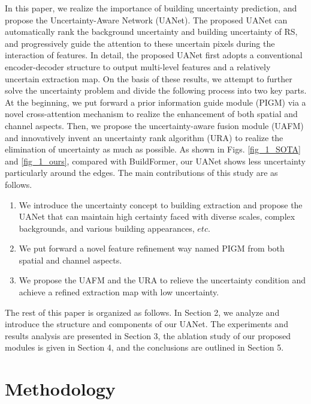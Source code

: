 \documentclass[lettersize,journal]{IEEEtran}
\begin{document}
\par
In this paper, we realize the importance of building uncertainty prediction, and propose the Uncertainty-Aware Network (UANet).
The proposed UANet can automatically rank the background uncertainty and building uncertainty of RS, and progressively guide the attention to these uncertain pixels during the interaction of features.
In detail, the proposed UANet first adopts a conventional encoder-decoder structure to output multi-level features and a relatively uncertain extraction map. On the basis of these results, we attempt to further solve the uncertainty problem and divide the following process into two key parts.
At the beginning, we put forward a prior information guide module (PIGM) via a novel cross-attention mechanism to realize the enhancement of both spatial and channel aspects. Then, we propose the uncertainty-aware fusion module (UAFM) and innovatively invent an uncertainty rank algorithm (URA) to realize the elimination of uncertainty as much as possible. As shown in Figs. \ref{fig_1_SOTA} and \ref{fig_1_ours}, compared with BuildFormer, our UANet shows less uncertainty particularly around the edges. The main contributions of this study are as follows.

\begin{enumerate}[]
\item We introduce the uncertainty concept to building extraction and propose the UANet that can maintain high certainty faced with diverse scales, complex backgrounds, and various building appearances, $etc$. 
\item We put forward a novel feature refinement way named PIGM from both spatial and channel aspects.
\item We propose the UAFM and the URA to relieve the uncertainty condition and achieve a refined extraction map with low uncertainty.
\end{enumerate}
\par
The rest of this paper is organized as follows. In Section 2, we analyze and introduce the structure and components of our UANet. The experiments and results analysis are presented in Section 3, the ablation study of our proposed modules is given in Section 4, and the conclusions are outlined in Section 5.

\section{Methodology}
\end{document}
